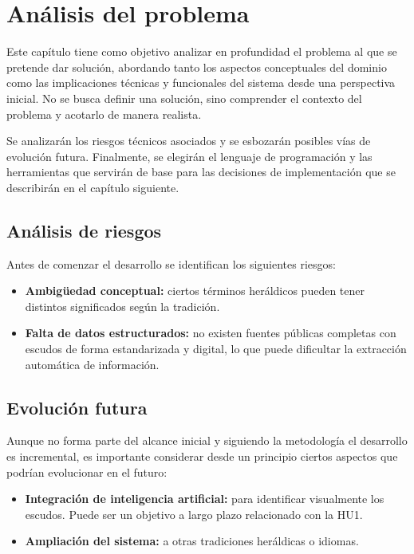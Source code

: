 \chapter{Análisis del problema}
Este capítulo tiene como objetivo analizar en profundidad el problema al que se pretende 
dar solución, abordando tanto los aspectos conceptuales del dominio como las implicaciones 
técnicas y funcionales del sistema desde una perspectiva inicial. No se busca definir una
solución, sino comprender el contexto del problema y acotarlo de manera realista.

Se analizarán los riesgos técnicos asociados y se esbozarán posibles vías de evolución futura. 
Finalmente, se elegirán el lenguaje de programación y las herramientas que servirán de base 
para las decisiones de implementación que se describirán en el capítulo siguiente.

\section{Análisis de riesgos}
Antes de comenzar el desarrollo se identifican los siguientes riesgos:

\begin{itemize}
    \item \textbf{Ambigüedad conceptual: } ciertos términos heráldicos pueden tener distintos
    significados según la tradición.
    \item \textbf{Falta de datos estructurados: } no existen fuentes públicas completas con escudos
    de forma estandarizada y digital, lo que puede dificultar la extracción automática de información.
\end{itemize}

\section{Evolución futura}
Aunque no forma parte del alcance inicial y siguiendo la metodología el desarrollo es incremental, 
es importante considerar desde un principio ciertos aspectos que podrían evolucionar en el futuro:

\begin{itemize}
    \item \textbf{Integración de inteligencia artificial: } para identificar visualmente los escudos.
    Puede ser un objetivo a largo plazo relacionado con la HU1.
    \item \textbf{Ampliación del sistema: } a otras tradiciones heráldicas o idiomas.
\end{itemize}

